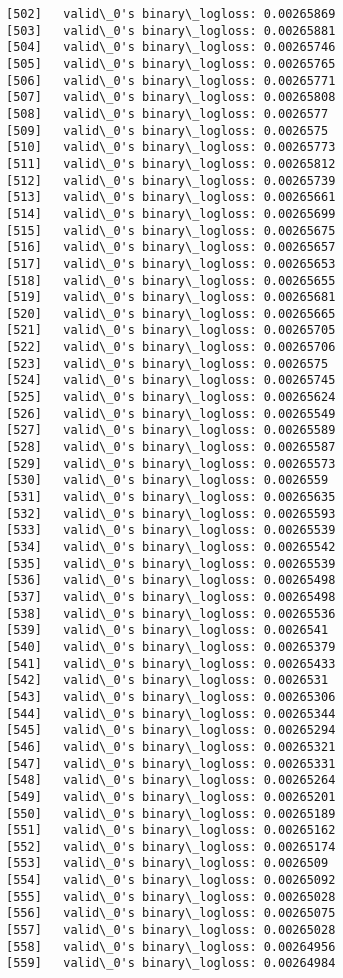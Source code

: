 \documentclass[11pt]{article}
\begin{document}
\begin{Verbatim}[commandchars=\\\{\}]
[502]	valid\_0's binary\_logloss: 0.00265869
[503]	valid\_0's binary\_logloss: 0.00265881
[504]	valid\_0's binary\_logloss: 0.00265746
[505]	valid\_0's binary\_logloss: 0.00265765
[506]	valid\_0's binary\_logloss: 0.00265771
[507]	valid\_0's binary\_logloss: 0.00265808
[508]	valid\_0's binary\_logloss: 0.0026577
[509]	valid\_0's binary\_logloss: 0.0026575
[510]	valid\_0's binary\_logloss: 0.00265773
[511]	valid\_0's binary\_logloss: 0.00265812
[512]	valid\_0's binary\_logloss: 0.00265739
[513]	valid\_0's binary\_logloss: 0.00265661
[514]	valid\_0's binary\_logloss: 0.00265699
[515]	valid\_0's binary\_logloss: 0.00265675
[516]	valid\_0's binary\_logloss: 0.00265657
[517]	valid\_0's binary\_logloss: 0.00265653
[518]	valid\_0's binary\_logloss: 0.00265655
[519]	valid\_0's binary\_logloss: 0.00265681
[520]	valid\_0's binary\_logloss: 0.00265665
[521]	valid\_0's binary\_logloss: 0.00265705
[522]	valid\_0's binary\_logloss: 0.00265706
[523]	valid\_0's binary\_logloss: 0.0026575
[524]	valid\_0's binary\_logloss: 0.00265745
[525]	valid\_0's binary\_logloss: 0.00265624
[526]	valid\_0's binary\_logloss: 0.00265549
[527]	valid\_0's binary\_logloss: 0.00265589
[528]	valid\_0's binary\_logloss: 0.00265587
[529]	valid\_0's binary\_logloss: 0.00265573
[530]	valid\_0's binary\_logloss: 0.0026559
[531]	valid\_0's binary\_logloss: 0.00265635
[532]	valid\_0's binary\_logloss: 0.00265593
[533]	valid\_0's binary\_logloss: 0.00265539
[534]	valid\_0's binary\_logloss: 0.00265542
[535]	valid\_0's binary\_logloss: 0.00265539
[536]	valid\_0's binary\_logloss: 0.00265498
[537]	valid\_0's binary\_logloss: 0.00265498
[538]	valid\_0's binary\_logloss: 0.00265536
[539]	valid\_0's binary\_logloss: 0.0026541
[540]	valid\_0's binary\_logloss: 0.00265379
[541]	valid\_0's binary\_logloss: 0.00265433
[542]	valid\_0's binary\_logloss: 0.0026531
[543]	valid\_0's binary\_logloss: 0.00265306
[544]	valid\_0's binary\_logloss: 0.00265344
[545]	valid\_0's binary\_logloss: 0.00265294
[546]	valid\_0's binary\_logloss: 0.00265321
[547]	valid\_0's binary\_logloss: 0.00265331
[548]	valid\_0's binary\_logloss: 0.00265264
[549]	valid\_0's binary\_logloss: 0.00265201
[550]	valid\_0's binary\_logloss: 0.00265189
[551]	valid\_0's binary\_logloss: 0.00265162
[552]	valid\_0's binary\_logloss: 0.00265174
[553]	valid\_0's binary\_logloss: 0.0026509
[554]	valid\_0's binary\_logloss: 0.00265092
[555]	valid\_0's binary\_logloss: 0.00265028
[556]	valid\_0's binary\_logloss: 0.00265075
[557]	valid\_0's binary\_logloss: 0.00265028
[558]	valid\_0's binary\_logloss: 0.00264956
[559]	valid\_0's binary\_logloss: 0.00264984

\end{Verbatim}
\end{document}
